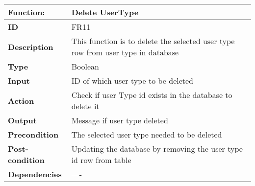 \documentclass[]{article}
\begin{document}
\FloatBarrier
\begin{table}[h]
\caption{}
\label{tab:my-table}
\begin{tabular}{|p{}|p{}|}
\hline
\textbf{Function:} & Delete UserType 
\\ \hline
\textbf{ID}  & FR11          

\\ \hline
\textbf{Description}  & This function is to delete the selected user type row from user type in database                                                                     
\\ \hline
\textbf{Type}   & Boolean         

\\ \hline
\textbf{Input}  & ID of which user type to be deleted 

\\ \hline
\textbf{Action} & Check if user Type id exists in the database to delete it 

\\ \hline
\textbf{Output}  & Message if user type deleted  

\\ \hline
\textbf{Precondition}   & The selected user type needed to be deleted   

\\ \hline
\textbf{Post-condition}  & Updating the database by removing the user type id row from table 

\\ \hline
\textbf{Dependencies}    & ---- 
\\ \hline
\end{tabular}
\end{table}
\end{document}
